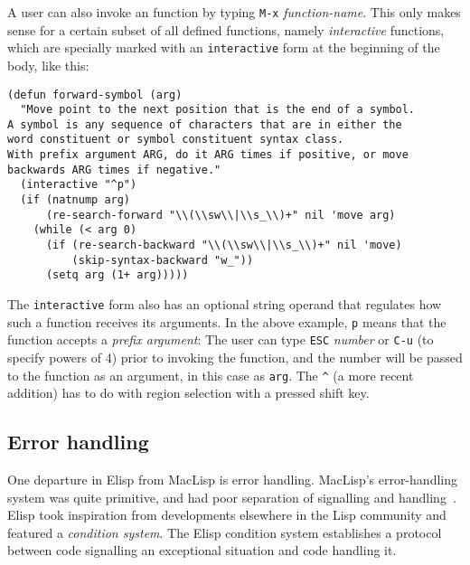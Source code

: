 \documentclass[format=acmsmall, review=false, screen=true]{acmart}
\newcommand \Elisp {Elisp}
\begin{document}
A user can also invoke an function by typing \texttt{M-x}
\textit{function-name}.  This only makes sense for a certain subset of
all defined functions, namely \textit{interactive} functions, which
are specially marked with an \texttt{interactive} form at the
beginning of the body, like this:
%
\begin{verbatim}
(defun forward-symbol (arg)
  "Move point to the next position that is the end of a symbol.
A symbol is any sequence of characters that are in either the
word constituent or symbol constituent syntax class.
With prefix argument ARG, do it ARG times if positive, or move
backwards ARG times if negative."
  (interactive "^p")
  (if (natnump arg)
      (re-search-forward "\\(\\sw\\|\\s_\\)+" nil 'move arg)
    (while (< arg 0)
      (if (re-search-backward "\\(\\sw\\|\\s_\\)+" nil 'move)
          (skip-syntax-backward "w_"))
      (setq arg (1+ arg)))))
\end{verbatim}
%
The \texttt{interactive} form also has an optional string operand that
regulates how such a function receives its arguments.  In the above
example, \verb|p| means that the function accepts a \textit{prefix
  argument}: The user can type \texttt{ESC} \textit{number} or
\texttt{C-u} (to specify powers of 4) prior to invoking the function,
and the number will be passed to the function as an argument, in this
case as \texttt{arg}.  The \verb|^| (a more recent addition) has to do with
region selection with a pressed shift key.

\subsection{Error handling}
\label{sec:error-handling}

One departure in \Elisp{} from MacLisp is error handling.  MacLisp's
error-handling system was quite primitive, and had poor separation of
signalling and handling~\cite{Pitman2001}.  \Elisp{} took inspiration
from developments elsewhere in the Lisp community and featured a
\emph{condition system}.  The \Elisp{} condition system establishes
a protocol between code signalling an exceptional situation and code
handling it.
\end{document}
